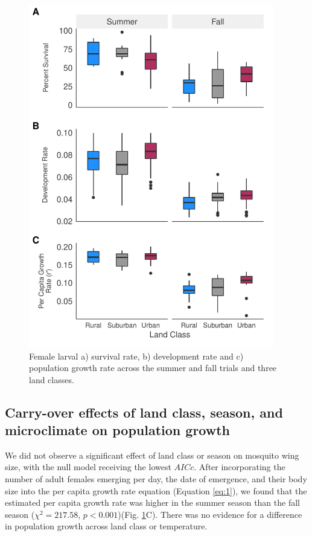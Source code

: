 \documentclass[12pt]{article}
\begin{document}
\begin{figure}
\centering\includegraphics[height=15cm, keepaspectratio]{Figure3.pdf}
\caption{Female larval a) survival rate, b) development rate and c) population growth rate across the summer and fall trials and three land classes.}
\label{fig:growth}
\end{figure}

\subsection{Carry-over effects of land class, season, and microclimate on population growth}

We did not observe a significant effect of land class or season on mosquito wing size, with the null model receiving the lowest $AICc$. After incorporating the number of adult females emerging per day, the date of emergence, and their body size into the per capita growth rate equation (Equation \ref{eq:1}), we found that the estimated per capita growth rate was higher in the summer season than the fall season ($\chi^2=217.58$, $p<0.001$)(Fig. \ref{fig:growth}C). There was no evidence for a difference in population growth across land class or temperature.
\end{document}

